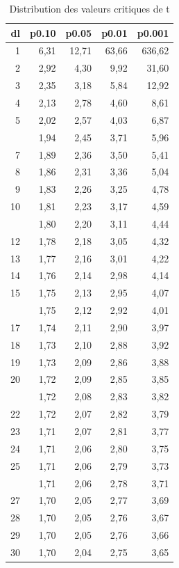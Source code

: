 \documentclass[
  11pt,
  french,
]{book}
\begin{document}
\begin{table}

\caption{\label{tab:tableCritiqueT}Distribution des valeurs critiques de t}
\centering
\fontsize{8}{10}\selectfont
\begin{tabular}[t]{rrrrr}
\toprule
dl & p0.10 & p0.05 & p0.01 & p0.001\\
\midrule
1 & 6,31 & 12,71 & 63,66 & 636,62\\
2 & 2,92 & 4,30 & 9,92 & 31,60\\
3 & 2,35 & 3,18 & 5,84 & 12,92\\
4 & 2,13 & 2,78 & 4,60 & 8,61\\
5 & 2,02 & 2,57 & 4,03 & 6,87\\
\addlinespace
6 & 1,94 & 2,45 & 3,71 & 5,96\\
7 & 1,89 & 2,36 & 3,50 & 5,41\\
8 & 1,86 & 2,31 & 3,36 & 5,04\\
9 & 1,83 & 2,26 & 3,25 & 4,78\\
10 & 1,81 & 2,23 & 3,17 & 4,59\\
\addlinespace
11 & 1,80 & 2,20 & 3,11 & 4,44\\
12 & 1,78 & 2,18 & 3,05 & 4,32\\
13 & 1,77 & 2,16 & 3,01 & 4,22\\
14 & 1,76 & 2,14 & 2,98 & 4,14\\
15 & 1,75 & 2,13 & 2,95 & 4,07\\
\addlinespace
16 & 1,75 & 2,12 & 2,92 & 4,01\\
17 & 1,74 & 2,11 & 2,90 & 3,97\\
18 & 1,73 & 2,10 & 2,88 & 3,92\\
19 & 1,73 & 2,09 & 2,86 & 3,88\\
20 & 1,72 & 2,09 & 2,85 & 3,85\\
\addlinespace
21 & 1,72 & 2,08 & 2,83 & 3,82\\
22 & 1,72 & 2,07 & 2,82 & 3,79\\
23 & 1,71 & 2,07 & 2,81 & 3,77\\
24 & 1,71 & 2,06 & 2,80 & 3,75\\
25 & 1,71 & 2,06 & 2,79 & 3,73\\
\addlinespace
26 & 1,71 & 2,06 & 2,78 & 3,71\\
27 & 1,70 & 2,05 & 2,77 & 3,69\\
28 & 1,70 & 2,05 & 2,76 & 3,67\\
29 & 1,70 & 2,05 & 2,76 & 3,66\\
30 & 1,70 & 2,04 & 2,75 & 3,65\\

\end{tabular}
\end{table}
\end{document}
